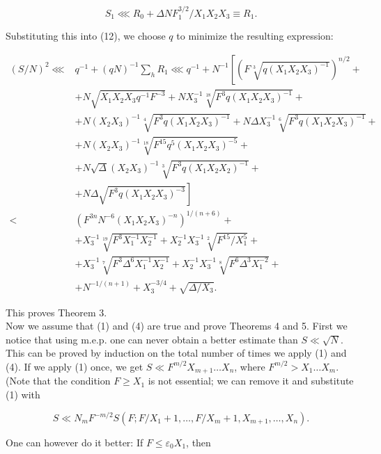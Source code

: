 \documentclass[10pt]{article}
\begin{document}
$$
S_{1} \lll R_{0}+\Delta N F_{1}^{3 / 2} / X_{1} X_{2} X_{3} \equiv R_{1} .
$$

Substituting this into (12), we choose $q$ to minimize the resulting expression:

$$
\begin{aligned}
(S / N)^{2} \lll & q^{-1}+(q N)^{-1} \sum_{h} R_{1} \lll q^{-1}+N^{-1}\left[\left(F \sqrt[3]{q\left(X_{1} X_{2} X_{3}\right)^{-1}}\right)^{n / 2}+\right. \\
& +N \sqrt{X_{1} X_{2} X_{3} q^{-1} F^{-3}}+N X_{3}^{-1} \sqrt[18]{F^{3} q\left(X_{1} X_{2} X_{3}\right)^{-1}}+ \\
& +N\left(X_{2} X_{3}\right)^{-1} \sqrt[4]{F^{3} q\left(X_{1} X_{2} X_{3}\right)^{-1}}+N \Delta X_{3}^{-1} \sqrt[6]{F^{3} q\left(X_{1} X_{2} X_{3}\right)^{-1}}+ \\
& +N\left(X_{2} X_{3}\right)^{-1} \sqrt[18]{F^{15} q^{5}\left(X_{1} X_{2} X_{3}\right)^{-5}}+ \\
& +N \sqrt{\Delta}\left(X_{2} X_{3}\right)^{-1} \sqrt[3]{F^{3} q\left(X_{1} X_{2} X_{2}\right)^{-1}}+ \\
& \left.+N \Delta \sqrt{F^{3} q\left(X_{1} X_{2} X_{3}\right)^{-3}}\right] \\
< & \left(F^{3 n} N^{-6}\left(X_{1} X_{2} X_{3}\right)^{-n}\right)^{1 /(n+6)}+ \\
& +X_{3}^{-1} \sqrt[19]{F^{3} X_{1}^{-1} X_{2}^{-1}}+X_{2}^{-1} X_{3}^{-1} \sqrt[2]{F^{15} / X_{1}^{5}}+ \\
& +X_{3}^{-1} \sqrt[7]{F^{3} \Delta^{6} X_{1}^{-1} X_{2}^{-1}}+X_{2}^{-1} X_{3}^{-1} \sqrt[8]{F^{6} \Delta^{3} X_{1}^{-2}}+ \\
& +N^{-1 /(n+1)}+X_{3}^{-3 / 4}+\sqrt{\Delta / X_{3}} .
\end{aligned}
$$

This proves Theorem 3.\\
Now we assume that (1) and (4) are true and prove Theorems 4 and 5. First we notice that using m.e.p. one can never obtain a better estimate than $S \ll \sqrt{N}$. This can be proved by induction on the total number of times we apply (1) and (4). If we apply (1) once, we get $S \ll F^{m / 2} X_{m+1} \ldots X_{n}$, where $F^{m / 2}>X_{1} \ldots X_{m}$. (Note that the condition $F \geqslant X_{1}$ is not essential; we can remove it and substitute (1) with

$$
S \ll N_{m} F^{-m / 2} S\left(F ; F / X_{1}+1, \ldots, F / X_{m}+1, X_{m+1}, \ldots, X_{n}\right) .
$$

One can however do it better: If $F \leqslant \varepsilon_{0} X_{1}$, then
\end{document}
